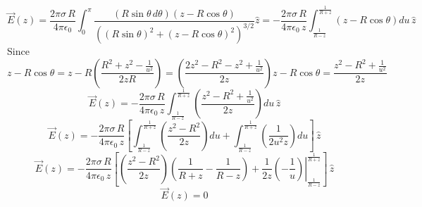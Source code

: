 \documentclass[12pt]{article}
\begin{document}
$$\vec{E}(z)=\frac{2\pi\sigma\,R}{4\pi\epsilon_0}\int_{0}^{\pi}\frac{(R\sin{\theta}\,d\theta)(z-R\cos{\theta})}{((R\sin{\theta})^2+(z-R\cos{\theta})^2)^{3/2}}\hat{z}=-\frac{2\pi\sigma\,R}{4\pi\epsilon_0\,z}\int_{\frac{1}{R-z}}^{\frac{1}{R+z}}(z-R\cos{\theta})du\,\hat{z}$$
Since $$z-R\cos{\theta}=z-R\left(\frac{R^2+z^2-\frac{1}{u^2}}{2zR} \right )=\left(\frac{2z^2-R^2-z^2+\frac{1}{u^2}}{2z} \right )z-R\cos{\theta}=\frac{z^2-R^2+\frac{1}{u^2}}{2z}$$
$$\vec{E}(z)=-\frac{2\pi\sigma\,R}{4\pi\epsilon_0\,z}\int_{\frac{1}{R-z}}^{\frac{1}{R+z}}\left(\frac{z^2-R^2+\frac{1}{u^2}}{2z} \right )du\,\hat{z}$$
$$\vec{E}(z)=-\frac{2\pi\sigma\,R}{4\pi\epsilon_0\,z}\left[\int_{\frac{1}{R-z}}^{\frac{1}{R+z}}\left(\frac{z^2-R^2}{2z} \right )du+\int_{\frac{1}{R-z}}^{\frac{1}{R+z}}\left(\frac{1}{2u^2z} \right )du\right ]\,\hat{z}$$
$$\vec{E}(z)=-\frac{2\pi\sigma\,R}{4\pi\epsilon_0\,z}\left[\left(\frac{z^2-R^2}{2z} \right )\left(\frac{1}{R+z}-\frac{1}{R-z} \right )+\frac{1}{2z}\left.\left(-\frac{1}{u} \right )\right|_{\frac{1}{R-z}}^{\frac{1}{R+z}}\right ]\,\hat{z}$$
$$\vec{E}(z)=0$$
\end{document}
